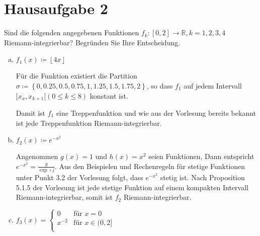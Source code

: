 \documentclass{article}
\begin{document}
\section*{Hausaufgabe 2}

Sind die folgenden angegebenen Funktionen
$f_k \colon [0, 2] \to \mathbb{R}, k = 1, 2, 3, 4$ Riemann-integrierbar?
Begründen Sie Ihre Entscheidung.

\begin{enumerate}[a)]
\item $f_1(x) \coloneqq \left\lfloor 4x \right\rfloor$
  

  Für die Funktion existiert die Partition
  $\sigma \coloneqq \left\{ 0, 0.25, 0.5, 0.75, 1, 1.25, 1.5, 1.75, 2 \right\}$,
  so dass $f_1$ auf jedem Intervall $[x_x, x_{k + 1}[ (0 \leq k \leq 8)$
  konstant ist.

  Damit ist $f_1$ eine Treppenfunktion und wie aus der Vorlesung bereits
  bekannt ist jede Treppenfunktion Riemann-integrierbar.
  
\item $f_2(x) \coloneqq e^{-x^2}$


  Angenommen $g(x) = 1$ und $h(x) = x^2$ seien Funktionen,
  Dann entspricht $e^{-x^2} = \frac{g}{\exp \circ j}$.
  Aus den Beispielen und Rechenregeln für stetige Funktionen unter Punkt
  3.2 der Vorlesung folgt, dass $e^{-x^2}$ stetig ist.
  Nach Proposition 5.1.5 der Vorlesung ist jede stetige Funktion auf einem
  kompakten Intervall Riemann-integrierbar, somit ist $f_2$ Riemann-integrierbar.

\item $f_3(x) = \begin{cases}
    0 & \text{für $x = 0$} \\
    x^{-2} & \text{für $x \in (0, 2]$} \\
  \end{cases}$


\end{enumerate}
\end{document}
